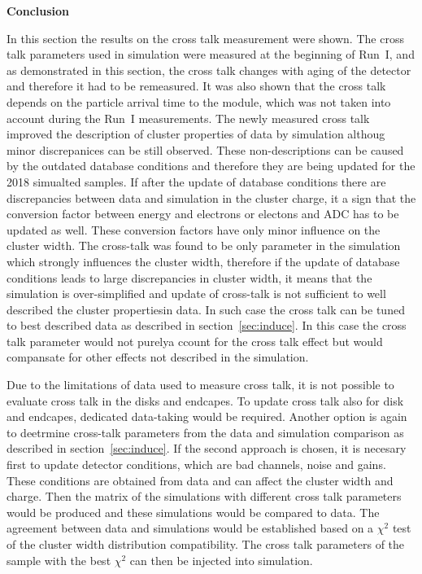 \textbf{Conclusion}

In this section the results on the cross talk measurement were shown. The cross talk parameters used in simulation were measured at the beginning of Run~I, and as demonstrated in this section, the cross talk changes with aging of the detector and therefore it had to be remeasured. It was also shown that the cross talk depends on the particle arrival time to the module, which was not taken into account during the Run~I measurements. The newly measured cross talk improved the description of cluster properties of data by simulation althoug minor discrepanices can be still observed. These non-descriptions can be caused by the outdated database conditions and therefore they are being updated for the 2018 simualted samples. If after the update of database conditions there are discrepancies between data and simulation in the cluster charge, it a sign that the conversion factor between energy and electrons or electons and ADC has to be updated as well. These conversion factors have only minor influence on the cluster width. The cross-talk was found to be only parameter in the simulation which strongly influences the cluster width, therefore if the update of database conditions leads to large discrepancies in cluster width, it means that the simulation is over-simplified and update of cross-talk is not sufficient to well described the cluster propertiesin data. In such case the cross talk can be tuned to best described data as described in section~\ref{sec:induce}. In this case the cross talk parameter would not purelya ccount for the cross talk effect but would compansate for other effects not described in the simulation.

Due to the limitations of data used to measure cross talk, it is not possible to evaluate cross talk in the disks and endcapes. To update cross talk also for disk and endcapes, dedicated data-taking would be required. Another option is again to deetrmine cross-talk parameters from the data and simulation comparison as described in section~\ref{sec:induce}. If the second approach is chosen, it is necesary first to update detector conditions, which are bad channels, noise and gains. These conditions are obtained from data and can affect the cluster width and charge. Then the matrix of the simulations with different cross talk parameters would be produced and these simulations would be compared to data. The agreement between data and simulations would be established based on a $\chi^{2}$ test of the cluster width distribution compatibility. The cross talk parameters of the sample with the best $\chi^{2}$ can then be injected into simulation. 



